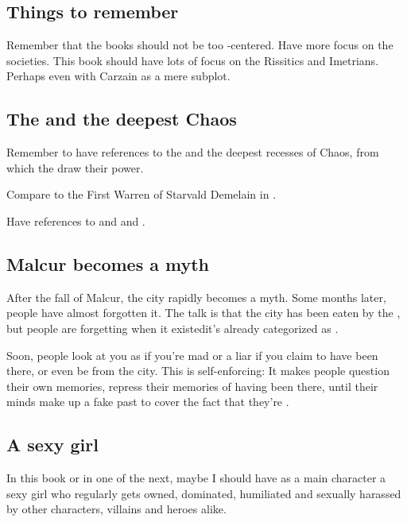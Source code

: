 \begin{garbage}
\subsection{Things to remember}
Remember that the books should not be too \human-centered. 
Have more focus on the \scathaese{} societies. 
This book should have lots of focus on the Rissitics and Imetrians. 
Perhaps even with Carzain as a mere subplot. 









\subsection{The \xzaishanns{} and the deepest Chaos}
Remember to have references to the \xzaishanns{} and the deepest recesses of Chaos, from which the \dragons{} draw their power. 

Compare to the First Warren of Starvald Demelain in \cite{StevenEriksonIanCameronEsslemont:MalazanBookoftheFallen}.

Have references to  and  and . 









\subsection{Malcur becomes a myth}
After the fall of Malcur, the city rapidly becomes a myth. Some months later, people have almost forgotten it. 
The talk is that the city has been eaten by the \Wylde{}, but people are forgetting when it existed\dash it's already categorized as . 

Soon, people look at you as if you're mad or a liar if you claim to have been there, or even be from the city. 
This is self-enforcing: 
It makes people question their own memories, repress their memories of having been there, until their minds make up a fake past to cover the fact that they're \Malcurian. 









\subsection{A sexy girl}
In this book or in one of the next, maybe I should have as a main character a sexy girl who regularly gets owned, dominated, humiliated and sexually harassed by other characters, villains and heroes alike. 






\end{garbage}
